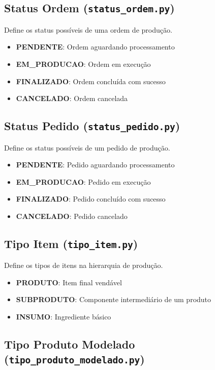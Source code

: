 \documentclass[11pt,a4paper]{article}
\begin{document}
\subsection{Status Ordem (\texttt{status\_ordem.py})}

Define os status possíveis de uma ordem de produção.

\begin{itemize}[leftmargin=2cm]
    \item \textbf{PENDENTE}: Ordem aguardando processamento
    \item \textbf{EM\_PRODUCAO}: Ordem em execução
    \item \textbf{FINALIZADO}: Ordem concluída com sucesso
    \item \textbf{CANCELADO}: Ordem cancelada
\end{itemize}

\subsection{Status Pedido (\texttt{status\_pedido.py})}

Define os status possíveis de um pedido de produção.

\begin{itemize}[leftmargin=2cm]
    \item \textbf{PENDENTE}: Pedido aguardando processamento
    \item \textbf{EM\_PRODUCAO}: Pedido em execução
    \item \textbf{FINALIZADO}: Pedido concluído com sucesso
    \item \textbf{CANCELADO}: Pedido cancelado
\end{itemize}

\subsection{Tipo Item (\texttt{tipo\_item.py})}

Define os tipos de itens na hierarquia de produção.

\begin{itemize}[leftmargin=2cm]
    \item \textbf{PRODUTO}: Item final vendável
    \item \textbf{SUBPRODUTO}: Componente intermediário de um produto
    \item \textbf{INSUMO}: Ingrediente básico
\end{itemize}

\subsection{Tipo Produto Modelado (\texttt{tipo\_produto\_modelado.py})}
\end{document}
